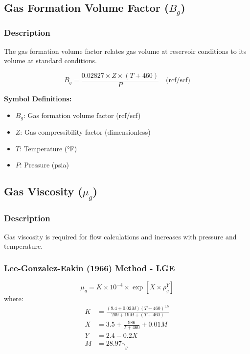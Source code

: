 \documentclass[11pt,a4paper]{article}
\newcommand{\symitem}[2]{\item \textbf{#1}: #2}
\begin{document}
\subsection{Gas Formation Volume Factor ($B_g$)}

\subsubsection{Description}
The gas formation volume factor relates gas volume at reservoir conditions to its volume at standard conditions.

\begin{tcolorbox}[colback=formulabox,colframe=black!75]
\begin{equation}
B_g = \frac{0.02827 \times Z \times (T + 460)}{P} \quad \text{(rcf/scf)}
\end{equation}
\end{tcolorbox}

\textbf{Symbol Definitions:}
\begin{itemize}[leftmargin=2cm]
\symitem{$B_g$}{Gas formation volume factor (rcf/scf)}
\symitem{$Z$}{Gas compressibility factor (dimensionless)}
\symitem{$T$}{Temperature (°F)}
\symitem{$P$}{Pressure (psia)}
\end{itemize}

\subsection{Gas Viscosity ($\mu_g$)}

\subsubsection{Description}
Gas viscosity is required for flow calculations and increases with pressure and temperature.

\subsubsection{Lee-Gonzalez-Eakin (1966) Method - LGE}

\begin{tcolorbox}[colback=formulabox,colframe=black!75]
\begin{equation}
\mu_g = K \times 10^{-4} \times \exp\left[X \times \rho_g^Y\right]
\end{equation}
where:
\begin{align}
K &= \frac{(9.4 + 0.02 M) (T+460)^{1.5}}{209 + 19M + (T+460)} \\
X &= 3.5 + \frac{986}{T+460} + 0.01M \\
Y &= 2.4 - 0.2X \\
M &= 28.97 \gamma_g
\end{align}
\end{tcolorbox}
\end{document}
